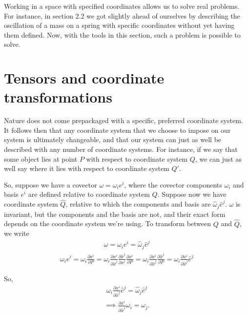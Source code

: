 \documentclass{book}
\begin{document}
Working in a space with specified coordinates allows us to solve real problems. For instance, in section 2.2 we got slightly ahead of ourselves by describing the oscillation of a mass on a spring with specific coordinates without yet having them defined. Now, with the tools in this section, such a problem is possible to solve.  



\section{Tensors and coordinate transformations}


Nature does not come prepackaged with a specific, preferred coordinate system. It follows then that any coordinate system that we choose to impose on our system is ultimately changeable, and that our system can just as well be described with any number of coordinate systems. For instance, if we say that some object lies at point $P$ with respect to coordinate system $Q$, we can just as well say where it lies with respect to coordinate system $Q'$. 


So, suppose we have a covector $\omega = \omega_i e^i$, where the covector components $\omega_i$ and basis $e^i$ are defined relative to coordinate system $Q$. Suppose now we have coordinate system $\hat{Q}$, relative to which the components and basis are $\hat{\omega}_j\hat{e}^j$. $\omega$ is invariant, but the components and the basis are not, and their exact form depends on the coordinate system we're using. To transform between $Q$ and $\hat{Q}$, we write \begin{gather}\omega = \omega_i e^i = \hat{\omega}_j \hat{e}^j  \end{gather}
\begin{gather}\omega_i e^i = \omega_i \frac{\partial x^i}{\partial P} = \omega_i \frac{\partial x^i}{\partial \hat{x}^j} \frac{\partial \hat{x}^j}{\partial x^i} \frac{\partial x^i}{\partial P}=  \omega_i \frac{\partial x^i}{\partial \hat{x}^j} \frac{\partial \hat{x}^j}{\partial P} = \omega_i \frac{\partial x^i}{\partial \hat{x}^j} \hat{e}^j\end{gather} 

So, \begin{gather}
\omega_i \frac{\partial x^i}{\partial \hat{x}^j} \hat{e}^j = \hat{\omega}_j \hat{e}^j
\end{gather}
\begin{gather} \implies  \frac{\partial x^i}{\partial \hat{x}^j} \omega_i = \omega_j.
\end{gather}
\end{document}
